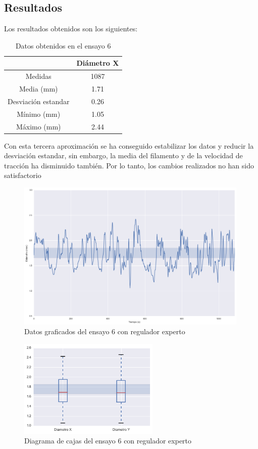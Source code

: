 \subsection{Resultados}
Los resultados obtenidos son los siguientes:

\begin{table}[H]
	\centering
	\begin{tabular}{cc}
		                    & Diámetro X \\ \hline
		Medidas             & 1087      \\
		Media (mm)          & 1.71       \\
		Desviación estandar & 0.26       \\
		Mínimo (mm)         & 1.05       \\
		Máximo (mm)         & 2.44      
	\end{tabular}
	\caption{Datos obtenidos en el ensayo 6}
	\label{tab:resl_ens6}
\end{table}

Con esta tercera aproximación se ha conseguido estabilizar los datos y reducir la desviación estandar, sin embargo, la media del filamento y de la velocidad de tracción ha disminuido también. Por lo tanto, los cambios realizados no han sido satisfactorio

\begin{figure}[H]
    \centering
    \includegraphics[width=0.99\textwidth]{images/producciones/13082015/output_9_e3.png}
    \caption{Datos graficados del ensayo 6 con regulador experto}
    \label{fig:reg_graf6}
\end{figure}

\begin{figure}[H]
    \centering
    \includegraphics[width=0.6\textwidth]{images/producciones/13082015/output_10_e3.png}
    \caption{Diagrama de cajas del ensayo 6 con regulador experto}
    \label{fig:reg_cajas6}
\end{figure}

